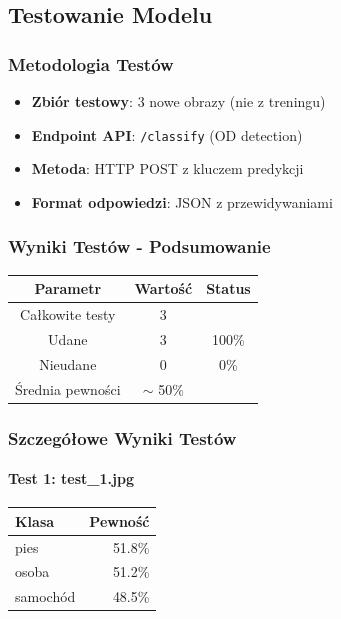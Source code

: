 \subsection{Testowanie Modelu}

\subsubsection{Metodologia Testów}

\begin{itemize}
	\item \textbf{Zbiór testowy}: 3 nowe obrazy (nie z treningu)
	\item \textbf{Endpoint API}: \texttt{/classify} (OD detection)
	\item \textbf{Metoda}: HTTP POST z kluczem predykcji
	\item \textbf{Format odpowiedzi}: JSON z przewidywaniami
\end{itemize}

\subsubsection{Wyniki Testów - Podsumowanie}

\begin{center}
	\begin{tabular}{|c|c|c|}
		\hline
		\textbf{Parametr} & \textbf{Wartość} & \textbf{Status} \\
		\hline
		Całkowite testy & 3 & \\
		Udane & 3 &  100\% \\
		Nieudane & 0 &  0\% \\
		Średnia pewności & $\sim$ 50\% &  \\
		\hline
	\end{tabular}
\end{center}

\subsubsection{Szczegółowe Wyniki Testów}

\paragraph{Test 1: test\_1.jpg}

\begin{center}
	\begin{tabular}{|l|r|}
		\hline
		\textbf{Klasa} & \textbf{Pewność} \\
		\hline
		pies & 51.8\% \\
		osoba & 51.2\% \\
		samochód & 48.5\% \\
		\hline
	\end{tabular}
\end{center}

